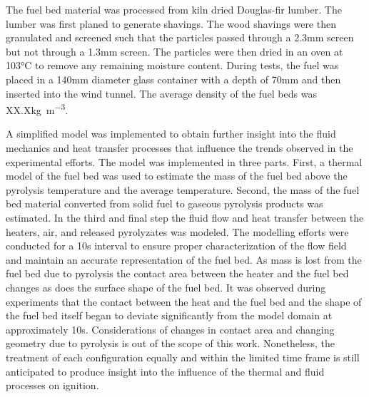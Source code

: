     The fuel bed material was processed from kiln dried Douglas-fir lumber. The lumber was first planed to generate shavings. The wood shavings were then granulated and screened such that the particles passed through a 2.3\si{\milli\meter} screen but not through a 1.3\si{\milli\meter} screen. The particles were then dried in an oven at 103\si{\celsius} to remove any remaining moisture content. During tests, the fuel was placed in a 140\si{\milli\meter} diameter glass container with a depth of 70\si{\milli\meter} and then inserted into the wind tunnel. The average density of the fuel beds was XX.X\si{\kilo\gram\per\cubic\meter}.
    
    A simplified model was implemented to obtain further insight into the fluid mechanics and heat transfer processes that influence the trends observed in the experimental efforts. The model was implemented in three parts. First, a thermal model of the fuel bed was used to estimate the mass of the fuel bed above the pyrolysis temperature and the average temperature. Second, the mass of the fuel bed material converted from solid fuel to gaseous pyrolysis products was estimated. In the third and final step the fluid flow and heat transfer between the heaters, air, and released pyrolyzates was modeled. The modelling efforts were conducted for a 10\si{\second} interval to ensure proper characterization of the flow field and maintain an accurate representation of the fuel bed. As mass is lost from the fuel bed due to pyrolysis the contact area between the heater and the fuel bed changes as does the surface shape of the fuel bed. It was observed during experiments that the contact between the heat and the fuel bed and the shape of the fuel bed itself began to deviate significantly from the model domain at approximately 10\si{\second}. Considerations of changes in contact area and changing geometry due to pyrolysis is out of the scope of this work. Nonetheless, the treatment of each configuration equally and within the limited time frame is still anticipated to produce insight into the influence of the thermal and fluid processes on ignition. 
    
